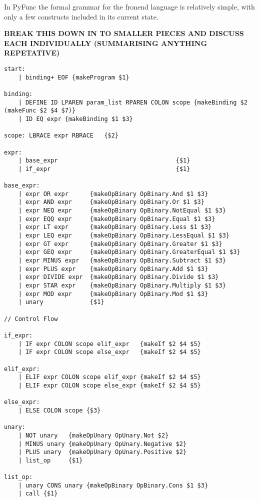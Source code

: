 \documentclass{l4proj}
\begin{document}
In PyFunc the formal grammar for the fronend language is relatively simple, with only a few constructs included in its current state.

\textbf{BREAK THIS DOWN IN TO SMALLER PIECES AND DISCUSS EACH INDIVIDUALLY (SUMMARISING ANYTHING REPETATIVE)}

\begin{lstlisting}[caption=PyFunc's full frontend grammar rules for Menhir., keepspaces=true]
    start:
    | binding+ EOF {makeProgram $1}

binding:
    | DEFINE ID LPAREN param_list RPAREN COLON scope {makeBinding $2 (makeFunc $2 $4 $7)}
    | ID EQ expr {makeBinding $1 $3}

scope: LBRACE expr RBRACE   {$2}

expr:
    | base_expr                                 {$1}
    | if_expr                                   {$1}

base_expr:
    | expr OR expr      {makeOpBinary OpBinary.And $1 $3}
    | expr AND expr     {makeOpBinary OpBinary.Or $1 $3}
    | expr NEQ expr     {makeOpBinary OpBinary.NotEqual $1 $3}
    | expr EQQ expr     {makeOpBinary OpBinary.Equal $1 $3}
    | expr LT expr      {makeOpBinary OpBinary.Less $1 $3}
    | expr LEQ expr     {makeOpBinary OpBinary.LessEqual $1 $3}
    | expr GT expr      {makeOpBinary OpBinary.Greater $1 $3}
    | expr GEQ expr     {makeOpBinary OpBinary.GreaterEqual $1 $3}
    | expr MINUS expr   {makeOpBinary OpBinary.Subtract $1 $3}
    | expr PLUS expr    {makeOpBinary OpBinary.Add $1 $3}
    | expr DIVIDE expr  {makeOpBinary OpBinary.Divide $1 $3}
    | expr STAR expr    {makeOpBinary OpBinary.Multiply $1 $3}
    | expr MOD expr     {makeOpBinary OpBinary.Mod $1 $3}
    | unary             {$1}

// Control Flow

if_expr:
    | IF expr COLON scope elif_expr   {makeIf $2 $4 $5}
    | IF expr COLON scope else_expr   {makeIf $2 $4 $5}

elif_expr:
    | ELIF expr COLON scope elif_expr {makeIf $2 $4 $5}
    | ELIF expr COLON scope else_expr {makeIf $2 $4 $5}

else_expr:
    | ELSE COLON scope {$3}

unary:
    | NOT unary   {makeOpUnary OpUnary.Not $2}
    | MINUS unary {makeOpUnary OpUnary.Negative $2}
    | PLUS unary  {makeOpUnary OpUnary.Positive $2}
    | list_op     {$1}

list_op:
    | unary CONS unary {makeOpBinary OpBinary.Cons $1 $3}
    | call {$1}


\end{lstlisting}
\end{document}
